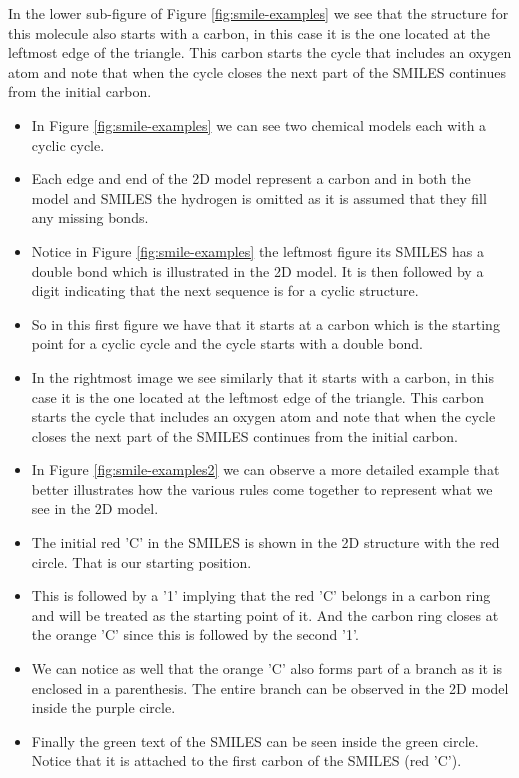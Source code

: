     In the lower sub-figure of  Figure \ref{fig:smile-examples} we see that the structure for this molecule also  starts with a carbon, in this case it is the one located at the leftmost edge of the triangle. This carbon starts the cycle that includes an oxygen atom and note that when the cycle closes the next part of the SMILES continues from the initial carbon.
        \begin{itemize}
            \item In Figure \ref{fig:smile-examples} we can see two chemical models each with a cyclic cycle.             
            \item Each edge and end of the 2D model represent a carbon and in both the model and SMILES the hydrogen is omitted as it is assumed that they fill any missing bonds.
            \item Notice in Figure \ref{fig:smile-examples} the leftmost figure its SMILES has a double bond which is illustrated in the 2D model. It is then followed by a digit indicating that the next sequence is for a cyclic structure. 
            \item So in this first figure we have that it starts at a carbon which is the starting point for a cyclic cycle and the cycle starts with a double bond. 
            \item In the rightmost image we see similarly that it starts with a carbon, in this case it is the one located at the leftmost edge of the triangle. This carbon starts the cycle that includes an oxygen atom and note that when the cycle closes the next part of the SMILES continues from the initial carbon.
            \item In Figure \ref{fig:smile-examples2} we can observe a more detailed example that better illustrates how the various rules come together to represent what we see in the 2D model.
            \item The initial red 'C' in the SMILES is shown in the 2D structure with the red circle. That is our starting position. 
            \item This is followed by a '1' implying that the red 'C' belongs in a carbon ring and will be treated as the starting point of it. And the carbon ring closes at the orange 'C' since this is followed by the second '1'.
            \item We can notice as well that the orange 'C' also forms part of a branch as it is enclosed in a parenthesis. The entire branch can be observed in the 2D model inside the purple circle.
            \item Finally the green text of the SMILES can be seen inside the green circle. Notice that it is attached to the first carbon of the SMILES (red 'C'). 
        \end{itemize}
    
